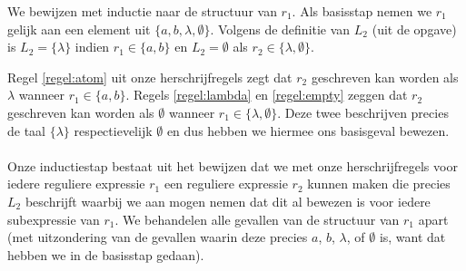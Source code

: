 \documentclass[a4paper,11pt]{article}
\begin{document}
We bewijzen met inductie naar de structuur van $r_{1}$. Als basisstap
nemen we $r_{1}$ gelijk aan een element uit $\{a,b,\lambda,\emptyset\}$.
Volgens de definitie van $L_{2}$ (uit de opgave) is $L_{2} = \{\lambda\}$
indien $r_{1} \in \{a,b\}$ en $L_{2} = \emptyset$ als $r_{2} \in
\{\lambda,\emptyset\}$.

Regel \ref{regel:atom} uit onze herschrijfregels zegt dat $r_{2}$ geschreven
kan worden als $\lambda$ wanneer $r_{1} \in \{a,b\}$. Regels
\ref{regel:lambda} en \ref{regel:empty} zeggen dat $r_{2}$ geschreven kan
worden als $\emptyset$ wanneer $r_{1} \in \{\lambda,\emptyset\}$. Deze twee
beschrijven precies de taal $\{\lambda\}$ respectievelijk $\emptyset$ en
dus hebben we hiermee ons basisgeval bewezen.

\paragraph{}

Onze inductiestap bestaat uit het bewijzen dat we met onze herschrijfregels
voor iedere reguliere expressie $r_{1}$ een reguliere expressie $r_{2}$
kunnen maken die precies $L_{2}$ beschrijft waarbij we aan mogen nemen dat
dit al bewezen is voor iedere subexpressie van $r_{1}$. We behandelen alle
gevallen van de structuur van $r_{1}$ apart (met uitzondering van de gevallen
waarin deze precies $a$, $b$, $\lambda$, of $\emptyset$ is, want dat hebben
we in de basisstap gedaan).

\paragraph{}
\end{document}
